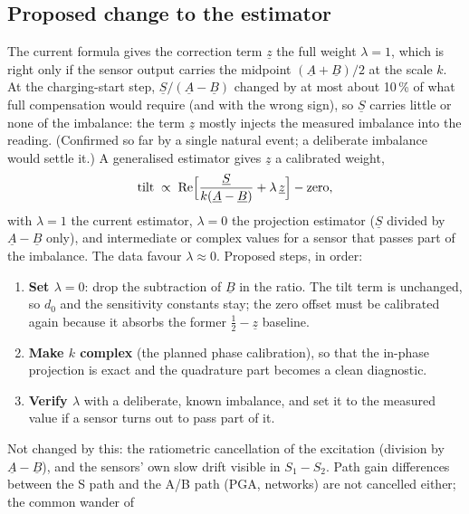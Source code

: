 \documentclass[11pt,a4paper]{article}
\begin{document}
\subsection{Proposed change to the estimator}

The current formula gives the correction term $\underline{z}$ the full weight
$\lambda=1$, which is right only if the sensor output carries the midpoint
$(\underline{A}+\underline{B})/2$ at the scale $k$.  At the charging-start
step, $\underline{S}/(\underline{A}-\underline{B})$ changed by at most about
10\,\% of what full compensation would require (and with the wrong sign), so
$\underline{S}$ carries little or none of the imbalance: the term
$\underline{z}$ mostly injects the measured imbalance into the reading.
(Confirmed so far by a single natural event; a deliberate imbalance would
settle it.)  A generalised estimator gives $\underline{z}$ a calibrated
weight,
\begin{equation}
  \text{tilt} \;\propto\; \operatorname{Re}\Bigl[
     \frac{\underline{S}}{k(\underline{A}-\underline{B})}
     + \lambda\,\underline{z}\Bigr] - \text{zero},
\end{equation}
with $\lambda=1$ the current estimator, $\lambda=0$ the projection estimator
($\underline{S}$ divided by $\underline{A}-\underline{B}$ only), and
intermediate or complex values for a sensor that passes part of the
imbalance.  The data favour $\lambda\approx0$.  Proposed steps, in order:
\begin{enumerate}
  \item \textbf{Set $\lambda=0$}: drop the subtraction of $\underline{B}$ in
        the ratio.  The tilt term is unchanged, so $d_0$ and the sensitivity
        constants stay; the zero offset must be calibrated again because it
        absorbs the former $\tfrac12-\underline{z}$ baseline.
  \item \textbf{Make $k$ complex} (the planned phase calibration), so that
        the in-phase projection is exact and the quadrature part becomes a
        clean diagnostic.
  \item \textbf{Verify $\lambda$} with a deliberate, known imbalance, and set
        it to the measured value if a sensor turns out to pass part of it.
\end{enumerate}
Not changed by this: the ratiometric cancellation of the excitation
(division by $\underline{A}-\underline{B}$), and the sensors' own slow drift
visible in $S_1-S_2$.  Path gain differences between the S path and the A/B
path (PGA, networks) are not cancelled either; the common wander of
\end{document}
